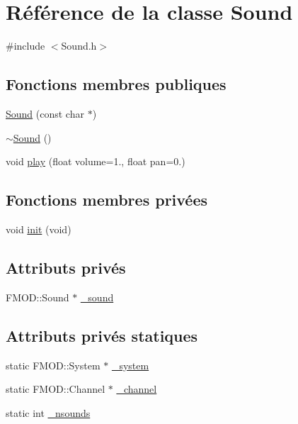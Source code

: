 \hypertarget{classSound}{}\section{Référence de la classe Sound}
\label{classSound}


{\ttfamily \#include $<$Sound.\+h$>$}

\subsection*{Fonctions membres publiques}
\begin{DoxyCompactItemize}
\item 
\hyperlink{classSound_ac85830f0d7c950d28141164edc7fe990}{Sound} (const char $\ast$)
\item 
\hyperlink{classSound_a0907389078bf740be2a5763366ad3376}{$\sim$\+Sound} ()
\item 
void \hyperlink{classSound_aeaa88e449a4e8f3503628452238d833c}{play} (float volume=1., float pan=0.)
\end{DoxyCompactItemize}
\subsection*{Fonctions membres privées}
\begin{DoxyCompactItemize}
\item 
void \hyperlink{classSound_a8f0f9eeae854569f7a7f110e3efec73a}{init} (void)
\end{DoxyCompactItemize}
\subsection*{Attributs privés}
\begin{DoxyCompactItemize}
\item 
F\+M\+O\+D\+::\+Sound $\ast$ \hyperlink{classSound_a4ebe6d9fd4b5d06957125f515190ac27}{\+\_\+sound}
\end{DoxyCompactItemize}
\subsection*{Attributs privés statiques}
\begin{DoxyCompactItemize}
\item 
static F\+M\+O\+D\+::\+System $\ast$ \hyperlink{classSound_aeeddfa10d6a7d247e566328a11903e06}{\+\_\+system}
\item 
static F\+M\+O\+D\+::\+Channel $\ast$ \hyperlink{classSound_abec2496805fd3f24b0b88f5d3c00128b}{\+\_\+channel}
\item 
static int \hyperlink{classSound_ae6fb5417aee48d6f9a46a930b967accb}{\+\_\+nsounds}
\end{DoxyCompactItemize}



